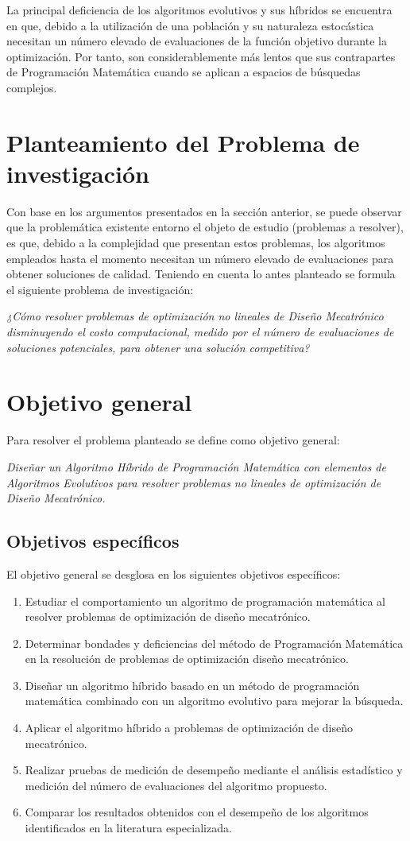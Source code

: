 La principal deficiencia de los algoritmos evolutivos y sus híbridos se encuentra en que, debido a la utilización de una población y su naturaleza estocástica necesitan un número elevado de evaluaciones de la función objetivo durante la optimización. Por tanto, son considerablemente más lentos que sus contrapartes de Programación Matemática cuando se aplican a espacios de búsquedas complejos. 
\section{Planteamiento del Problema de investigación}
  
Con base en los argumentos presentados en la sección anterior, se puede observar que la problemática existente entorno el objeto de estudio (problemas a resolver), es que, debido a la complejidad que presentan estos problemas, los algoritmos empleados hasta el momento necesitan un número elevado de evaluaciones para obtener soluciones de calidad. Teniendo en cuenta lo antes planteado se formula el siguiente problema de investigación:

  \textit{¿Cómo resolver problemas de optimización no lineales de Diseño Mecatrónico disminuyendo el costo computacional, medido por el número de evaluaciones de soluciones potenciales, para obtener una solución competitiva?}
  \section{Objetivo general}
  Para resolver el problema planteado se define como objetivo general:
  
  
 \textit{ Diseñar un Algoritmo Híbrido de Programación Matemática con elementos de Algoritmos Evolutivos  para resolver problemas no lineales de optimización de  Diseño Mecatrónico.} 
  \subsection{Objetivos específicos}
  El objetivo general se desglosa en los siguientes objetivos específicos:
  \begin{enumerate}
  	\item	Estudiar el comportamiento un algoritmo de programación matemática al resolver problemas de optimización de diseño mecatrónico.
  	\item	Determinar bondades y deficiencias del método de Programación Matemática en la resolución de problemas de optimización diseño mecatrónico.
  	\item	Diseñar un algoritmo híbrido basado en un método de programación matemática combinado con un algoritmo evolutivo para mejorar la búsqueda.
  	\item	Aplicar el algoritmo híbrido a problemas de optimización de diseño mecatrónico.
  	\item	Realizar pruebas de medición de desempeño mediante el análisis estadístico y medición del número de evaluaciones del algoritmo propuesto.
  	\item	Comparar los resultados obtenidos con el desempeño de los algoritmos identificados en la literatura especializada.
  \end{enumerate}
  
